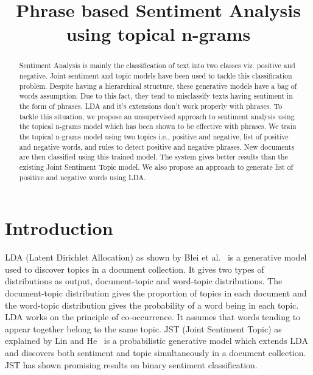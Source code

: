 \documentclass[11pt]{article}
\title{Phrase based Sentiment Analysis using topical n-grams}
\date{}
\begin{document}
\maketitle
\begin{abstract}
Sentiment Analysis is mainly the classification of text into two classes viz. 
positive and negative. Joint sentiment and topic models have been used to 
tackle this classification problem.  Despite having a hierarchical structure, 
these generative models have a bag of words assumption. Due to this fact, 
they tend to misclassify texts having sentiment in the form of phrases. LDA 
and it's extensions don't work properly with phrases. To tackle this situation, 
we propose an unsupervised approach to sentiment analysis using the topical n-grams model
which has been shown to be effective with phrases. We train the topical n-grams 
model using two topics i.e., positive and negative, list of positive and negative 
words, and rules to detect positive and negative phrases. New documents are then 
classified using this trained model. The system gives better results than the 
existing Joint Sentiment Topic model. We also propose an approach to generate 
list of positive and negative words using LDA.

\end{abstract}

\section{Introduction}


\indent LDA (Latent Dirichlet Allocation) as shown by Blei et al.~ 
is a generative model used to discover topics in a document collection. It gives two types of 
distributions as output, document-topic and word-topic distributions. The document-topic
distribution gives the proportion of topics in each document and the word-topic 
distribution gives the probability of a word being in each topic. LDA works on the 
principle of co-occurrence. It assumes that words tending to appear together belong 
to the same topic. JST (Joint Sentiment Topic) as explained by Lin and He~ 
is a probabilistic generative model which extends LDA and discovers both sentiment 
and topic simultaneously in a document collection. JST has shown promising results 
on binary sentiment classification. 
\end{document}
